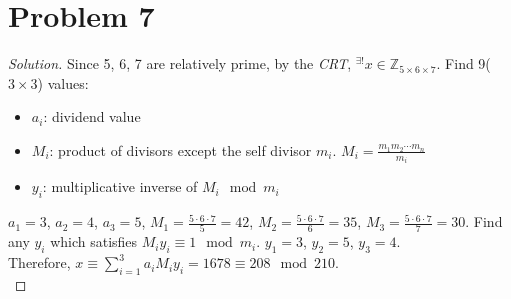 \section*{Problem 7}
	\begin{proof} [Solution]
		Since 5, 6, 7 are relatively prime, by the \textit{CRT}, $^{\exists!}x \in \mathbb{Z}_{5\times6\times7}$. Find 9($3\times3$) values:
		\begin{itemize}
			\item $a_i$: dividend value
			\item $M_i$: product of divisors except the self divisor $m_i$. $M_i = \frac{m_1m_2\cdots m_n}{m_i}$
			\item $y_i$: multiplicative inverse of $M_i \mod m_i$ 
		\end{itemize}
		$a_1 = 3$, $a_2 = 4$, $a_3 = 5$, $M_1 = \frac{5\cdot6\cdot7}{5} = 42$, $M_2 = \frac{5\cdot6\cdot7}{6} = 35$, $M_3 = \frac{5\cdot6\cdot7}{7} = 30$. Find any $y_i$ which satisfies $M_iy_i \equiv 1 \mod m_i$. $y_1 = 3$, $y_2 = 5$, $y_3 = 4$.\\
		Therefore, $x \equiv \sum\limits_{i = 1}^{3}a_iM_iy_i = 1678 \equiv 208 \mod 210$.\\
	\end{proof}